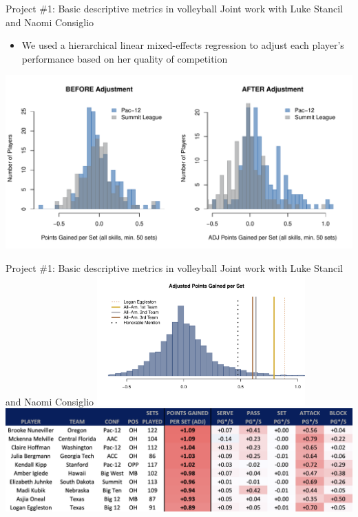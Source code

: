 \documentclass[handout]{beamer}
\begin{document}
\begin{frame}{Project \#1: Basic descriptive metrics in volleyball}
  {Joint work with Luke Stancil and Naomi Consiglio}
  \begin{itemize}
    \item We used a hierarchical linear mixed-effects regression to adjust each player's performance based on her quality of competition
  \end{itemize}
  \includegraphics[width = \textwidth]{images/conference_comparison.pdf}
\end{frame}


\begin{frame}{Project \#1: Basic descriptive metrics in volleyball}
  {Joint work with Luke Stancil and Naomi Consiglio}
  \centering
  \includegraphics[width = 0.6\textwidth]{images/avca_all_americans_adj.pdf}\\
  \includegraphics[width = \textwidth]{images/top_ten_players.png}
\end{frame}
\end{document}
